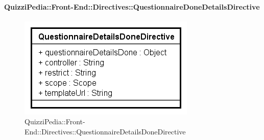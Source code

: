 \paragraph[QuizziPedia::Front-End::Directives\\::QuestionnaireDoneDetailsDirective]{QuizziPedia::Front-End::Directives::QuestionnaireDoneDetailsDirective}

\label{QuizziPedia::Front-End::Directives::QuestionnaireDoneDetailsDirective}

\begin{figure}[ht]
	\centering
	\includegraphics[scale=0.80,keepaspectratio]{UML/Classi/Front-End/QuizziPedia_Front-end_Directives_QuestionnaireDetailsDoneDirective.png}
	\caption{QuizziPedia::Front-End::Directives::QuestionnaireDetailsDoneDirective}
\end{figure} \FloatBarrier

